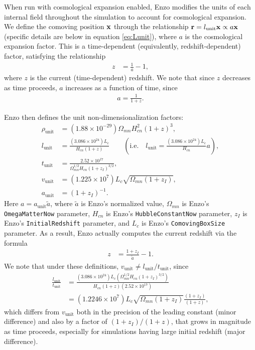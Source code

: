 \documentclass[10pt]{article}
\renewcommand{\(}{\left(}
\renewcommand{\)}{\right)}
\newcommand{\xvec}{{\bf x}}
\newcommand{\rvec}{{\bf r}}
\newcommand{\Aunit}{a_{\text{unit}}}
\newcommand{\Lunit}{l_{\text{unit}}}
\newcommand{\Dunit}{\rho_{\text{unit}}}
\newcommand{\Tunit}{t_{\text{unit}}}
\newcommand{\Vunit}{v_{\text{unit}}}
\newcommand{\tA}{\tilde{a}}
\begin{document}
When run with cosmological expansion enabled, Enzo modifies the
units of each internal field throughout the simulation to account for
cosmological expansion.  We define the comoving position $\xvec$
through the relationship $\rvec = \Lunit\xvec \propto a \xvec$
(specific details are below in equation \eqref{eq:Lunit}), where $a$
is the cosmological expansion factor.  This is a time-dependent
(equivalently, redshift-dependent) factor, satisfying the relationship
\begin{align}
  \label{eq:CurrentRedshift}
  z &= \frac{1}{a} - 1,
\end{align}
where $z$ is the current (time-dependent) redshift.  We note that
since $z$ decreases as time proceeds, $a$ increases as a function of
time, since 
\begin{align}
  \label{eq:expansion_factor}
  a = \frac{1}{1+z}.
\end{align}

Enzo then defines the unit non-dimensionalization factors:
\begin{align}
  \label{eq:Dunit}
  \Dunit &= (1.88\times10^{-29}) \Omega_{mn} H_{cn}^2 (1 + z)^3, \\
  \label{eq:Lunit}
  \Lunit &= \frac{(3.086\times10^{24}) L_c}{H_{cn} (1 + z)}
          \qquad \left(\text{i.e.}\quad \Lunit = \frac{(3.086\times10^{24}) L_c}{H_{cn}}a\right), \\
  \label{eq:Tunit}
  \Tunit &= \frac{2.52\times10^{17}}{\Omega_{mn}^{1/2} H_{cn} (1 + z_I)^{3/2}}, \\
  \label{eq:Vunit}
  \Vunit &= (1.225\times10^{7}) L_c \sqrt{\Omega_{mn}(1 + z_I)}, \\
  \label{eq:Aunit}
  \Aunit &= (1+z_I)^{-1}.
\end{align}
Here $a = \Aunit \tA$, where $\tA$ is Enzo's normalized value,  
$\Omega_{mn}$ is Enzo's {\tt OmegaMatterNow} parameter, 
$H_{cn}$ is Enzo's {\tt HubbleConstantNow} parameter, 
$z_I$ is Enzo's {\tt InitialRedshift} parameter, and
$L_c$ is Enzo's {\tt ComovingBoxSize} parameter.
As a result, Enzo actually computes the current redshift via the
formula 
\begin{align}
  \label{eq:CurrentRedshiftFormula}
  z &= \frac{1 + z_I}{\tA} - 1.
\end{align}
We note that under these definitions, $\Vunit \ne \Lunit / \Tunit$, since
\begin{align*}
   \frac{\Lunit}{\Tunit} &= 
   \frac{(3.086\times10^{24}) L_c \left(\Omega_{mn}^{1/2} H_{cn} (1 + z_I)^{3/2}\right)}
         {H_{cn} (1 + z)\left(2.52\times10^{17}\right)} \\
   &= 
   (1.2246\times10^{7}) L_c \sqrt{\Omega_{mn}(1 + z_I)} \frac{(1 + z_I)}{(1 + z)},
\end{align*}
which differs from $\Vunit$ both in the precision of the leading
constant (minor difference) and also by a factor of $(1+z_I)/(1+z)$, that grows
in magnitude as time proceeds, especially for simulations having large
initial redshift (major difference).
\end{document}
